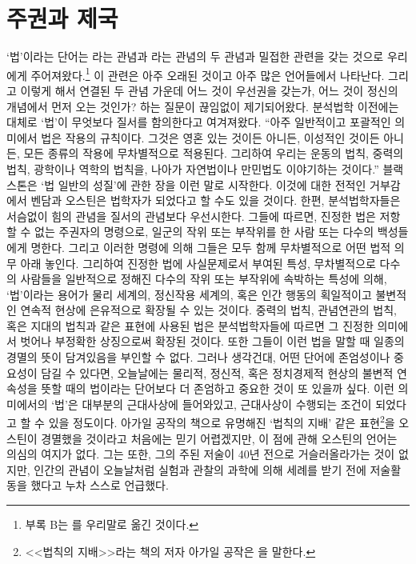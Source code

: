\chapter{주권과 제국}

`법'이라는 단어는
라는 관념과
라는 관념의 두 관념과 밀접한 관련을 갖는 것으로
우리에게 주어져왔다.\footnote{%
  부록 B는 를
  우리말로 옮긴 것이다. }
이 관련은 아주 오래된 것이고
아주 많은 언어들에서 나타난다.
그리고 이렇게 해서 연결된 두 관념 가운데
어느 것이 우선권을 갖는가,
어느 것이 정신의 개념에서 먼저 오는 것인가?
하는 질문이 끊임없이 제기되어왔다.
분석법학 이전에는 대체로
`법'이 무엇보다 질서를 함의한다고 여겨져왔다.
``아주 일반적이고 포괄적인 의미에서 법은 작용의 규칙이다.
그것은 영혼 있는 것이든 아니든,
이성적인 것이든 아니든,
모든 종류의 작용에 무차별적으로 적용된다.
그리하여 우리는 운동의 법칙, 중력의 법칙, 광학이나 역학의 법칙을,
나아가 자연법이나 만민법도 이야기하는 것이다.''
블랙스톤은 `법 일반의 성질'에 관한 장을 이런 말로 시작한다.
이것에 대한 전적인 거부감에서
벤담과 오스틴은 법학자가 되었다고
할 수도 있을 것이다.
한편, 분석법학자들은 서슴없이 힘의 관념을 질서의 관념보다 우선시한다.
그들에 따르면,
진정한 법은 저항할 수 없는 주권자의 명령으로,
일군의 작위 또는 부작위를 한 사람 또는 다수의 백성들에게 명한다.
그리고
이러한 명령에 의해 그들은
모두 함께 무차별적으로
어떤 법적 의무 아래 놓인다.
그리하여
진정한 법에
사실문제로서
부여된 특성,
무차별적으로
다수의 사람들을
일반적으로 정해진
다수의 작위 또는 부작위에 속박하는 특성에 의해,
`법'이라는 용어가
물리 세계의, 정신작용 세계의, 혹은 인간 행동의
획일적이고 불변적인 연속적 현상에
은유적으로 확장될 수 있는 것이다.
중력의 법칙, 관념연관의 법칙, 혹은 지대의 법칙과 같은 표현에 사용된
법은 분석법학자들에 따르면
그 진정한 의미에서 벗어나 부정확한 상징으로써 확장된 것이다.
또한 그들이 이런 법을 말할 때 일종의 경멸의 뜻이 담겨있음을 부인할 수 없다.
그러나 생각건대,
어떤 단어에 존엄성이나 중요성이 담길 수 있다면,
오늘날에는 물리적, 정신적, 혹은 정치경제적 현상의 불변적 연속성을
뜻할 때의 법이라는 단어보다 더 존엄하고 중요한 것이 또 있을까 싶다.
이런 의미에서의 `법'은 대부분의 근대사상에 들어와있고,
근대사상이 수행되는 조건이 되었다고 할 수 있을 정도이다.
아가일 공작의 책으로 유명해진
`법칙의 지배' 같은 표현\footnote{%
  <<법칙의 지배>>라는
  책의 저자 아가일 공작은
  을 말한다.
}을 오스틴이 경멸했을 것이라고 처음에는 믿기 어렵겠지만,
이 점에 관해
오스틴의 언어는
의심의 여지가 없다. 그는
또한, 그의 주된 저술이 40년 전으로 거슬러올라가는 것이 없지만,
인간의 관념이 오늘날처럼 실험과 관찰의 과학에 의해 세례를 받기 전에
저술활동을 했다고 누차 스스로 언급했다.

